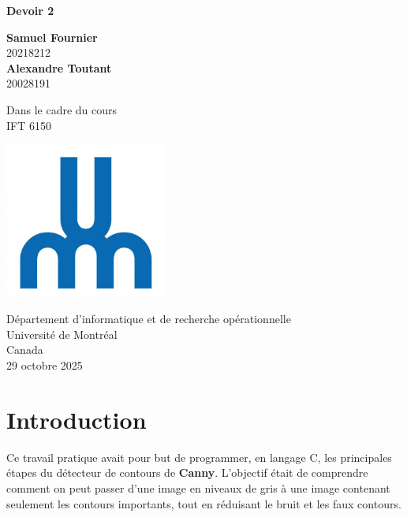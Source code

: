 \documentclass{article}
\begin{document}
\begin{titlepage}
	\begin{center}
		\vspace*{1cm}

		\Huge
		\textbf{Devoir 2}

		\vspace{0.5cm}
		\LARGE

		\vspace{1.5cm}

        
		\textbf{Samuel Fournier}\\20218212 \\
		\vfill
		\textbf{Alexandre Toutant}\\20028191 \\
		\vfill


		Dans le cadre du cours\\
		IFT 6150


		\vspace{0.8cm}

		\includegraphics[width=0.4\textwidth]{udem.jpg}

		\Large
		Département d'informatique et de recherche opérationnelle\\
		Université de Montréal\\
		Canada\\
		29 octobre 2025

	\end{center}
\end{titlepage}
\section{Introduction}

Ce travail pratique avait pour but de programmer, en langage C, les principales étapes du détecteur de contours de \textbf{Canny}.  
L'objectif était de comprendre comment on peut passer d'une image en niveaux de gris à une image contenant seulement les contours importants, tout en réduisant le bruit et les faux contours.
\end{document}
